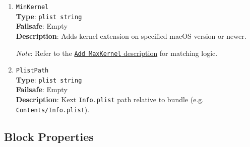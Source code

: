 \documentclass[]{article}
\begin{document}
\begin{enumerate}
\item
  \texttt{MinKernel}\\
  \textbf{Type}: \texttt{plist\ string}\\
  \textbf{Failsafe}: Empty\\
  \textbf{Description}: Adds kernel extension on specified macOS version or newer.

  \emph{Note}: Refer to the \hyperlink{kernmatch}{\texttt{Add\ MaxKernel} description} for matching logic.

\item
  \texttt{PlistPath}\\
  \textbf{Type}: \texttt{plist\ string}\\
  \textbf{Failsafe}: Empty\\
  \textbf{Description}: Kext \texttt{Info.plist} path relative to bundle
  (e.g. \texttt{Contents/Info.plist}).

\end{enumerate}

\subsection{Block Properties}\label{kernelpropsblock}
\end{document}
